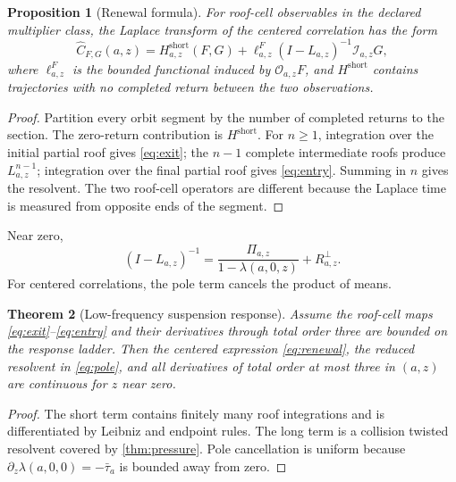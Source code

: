 \documentclass[11pt,reqno]{amsart}
\newtheorem{theorem}{Theorem}[section]
\newtheorem{proposition}[theorem]{Proposition}
\theoremstyle{definition}
\theoremstyle{remark}
\begin{document}
\begin{proposition}[Renewal formula]\label{prop:renewal}
For roof-cell observables in the declared multiplier class, the Laplace
transform of the centered correlation has the form
\begin{equation}\label{eq:renewal}
 \widehat C_{F,G}(a,z)
 =H_{a,z}^{\mathrm{short}}(F,G)
 +\ell_{a,z}^{F}
 (I-L_{a,z})^{-1}\mathcal I_{a,z}G,
\end{equation}
where $\ell_{a,z}^{F}$ is the bounded functional induced by
$\mathcal O_{a,z}F$, and $H^{\mathrm{short}}$ contains trajectories with no
completed return between the two observations.
\end{proposition}

\begin{proof}
Partition every orbit segment by the number of completed returns to the
section.  The zero-return contribution is $H^{\mathrm{short}}$.  For $n\ge1$,
integration over the initial partial roof gives \eqref{eq:exit}; the $n-1$
complete intermediate roofs produce $L_{a,z}^{n-1}$; integration over the
final partial roof gives \eqref{eq:entry}.  Summing in $n$ gives the resolvent.
The two roof-cell operators are different because the Laplace time is measured
from opposite ends of the segment.
\end{proof}

Near zero,
\begin{equation}\label{eq:pole}
 (I-L_{a,z})^{-1}
 =\frac{\Pi_{a,z}}{1-\lambda(a,0,z)}+R_{a,z}^{\perp}.
\end{equation}
For centered correlations, the pole term cancels the product of means.

\begin{theorem}[Low-frequency suspension response]\label{thm:suspension}
Assume the roof-cell maps \eqref{eq:exit}--\eqref{eq:entry} and their derivatives
through total order three are bounded on the response ladder.  Then the
centered expression \eqref{eq:renewal}, the reduced resolvent in
\eqref{eq:pole}, and all derivatives of total order at most three in $(a,z)$
are continuous for $z$ near zero.
\end{theorem}

\begin{proof}
The short term contains finitely many roof integrations and is differentiated
by Leibniz and endpoint rules.  The long term is a collision twisted resolvent
covered by \cref{thm:pressure}.  Pole cancellation is uniform because
$\partial_z\lambda(a,0,0)=-\bar\tau_a$ is bounded away from zero.
\end{proof}
\end{document}
